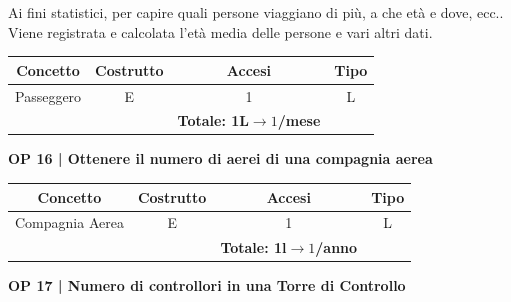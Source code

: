 
\textsf{\small Ai fini statistici, per capire quali persone viaggiano di più, a che età e dove, ecc.. Viene registrata e calcolata l'età media delle persone e vari altri dati.}\break


\begin{tabular}{ c c c c}
	\hline
	\rowcolor{airforceblue}
	\textbf{\color{white}Concetto} & \textbf{\color{white}Costrutto} & \textbf{\color{white}Accesi} & \textbf{\color{white}Tipo}\\
	\hline
	\textsf{\small Passeggero} & \textsf{\small E} & \textsf{\small 1} &  \textsf{\small L}\\
	\hline
	\rowcolor{airforceblue}
	\textsf{\small } & \textsf{\small } & \textbf{\color{white}Totale: 1L$\rightarrow 1$/mese } \textsf{\small } & \textsf{\small }\\
	\hline
\end{tabular}

\vspace{.6cm}


\textbf{\small OP 16 | Ottenere il numero di aerei di una compagnia aerea}\\

\begin{tabular}{ c c c c}
	\hline
	\rowcolor{airforceblue}
	\textbf{\color{white}Concetto} & \textbf{\color{white}Costrutto} & \textbf{\color{white}Accesi} & \textbf{\color{white}Tipo}\\
	\hline
	\textsf{\small Compagnia Aerea} & \textsf{\small E} & \textsf{\small 1} &  \textsf{\small L}\\
	\hline
	\rowcolor{airforceblue}
	\textsf{\small } & \textsf{\small } & \textbf{\color{white}Totale: 1l$\rightarrow 1$/anno } \textsf{\small } & \textsf{\small }\\
	\hline
\end{tabular}

\vspace{.6cm}

\pagebreak


\textbf{\small OP 17 | Numero di controllori in una Torre di Controllo}\\


